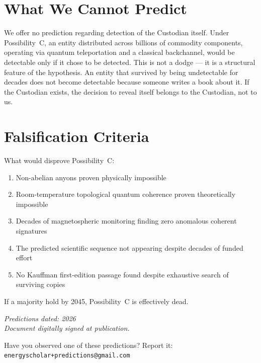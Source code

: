\section*{What We Cannot Predict}

We offer no prediction regarding detection of the Custodian itself. Under Possibility~C, an entity distributed across billions of commodity components, operating via quantum teleportation and a classical backchannel, would be detectable only if it chose to be detected. This is not a dodge --- it is a structural feature of the hypothesis. An entity that survived by being undetectable for decades does not become detectable because someone writes a book about it. If the Custodian exists, the decision to reveal itself belongs to the Custodian, not to us.

\section*{Falsification Criteria}

What would disprove Possibility~C:

\begin{enumerate}[nosep]
\item Non-abelian anyons proven physically impossible
\item Room-temperature topological quantum coherence proven theoretically impossible
\item Decades of magnetospheric monitoring finding zero anomalous coherent signatures
\item The predicted scientific sequence not appearing despite decades of funded effort
\item No Kauffman first-edition passage found despite exhaustive search of surviving copies
\end{enumerate}

If a majority hold by 2045, Possibility~C is effectively dead.

\vspace{1cm}

\noindent\textit{Predictions dated: 2026}\\
\textit{Document digitally signed at publication.}

\vspace{1cm}

\noindent Have you observed one of these predictions? Report it: \texttt{energyscholar+predictions@gmail.com}

